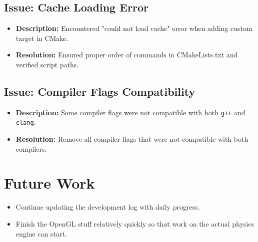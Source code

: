 \documentclass[a4paper,12pt]{article}
\begin{document}
\subsection{Issue: Cache Loading Error}
\begin{itemize}
    \item \textbf{Description:} Encountered "could not load cache" error when adding custom target in CMake.
    \item \textbf{Resolution:} Ensured proper order of commands in CMakeLists.txt and verified script paths.
\end{itemize}

\subsection{Issue: Compiler Flags Compatibility}
\begin{itemize}
    \item \textbf{Description:} Some compiler flags were not compatible with both \texttt{g++} and \texttt{clang}.
    \item \textbf{Resolution:} Remove all compiler flags that were not compatible with both compilers.
\end{itemize}

\section{Future Work}
\begin{itemize}
    \item Continue updating the development log with daily progress.
    \item Finish the OpenGL stuff relatively quickly so that work on the actual physics engine can start.
\end{itemize}
\end{document}
